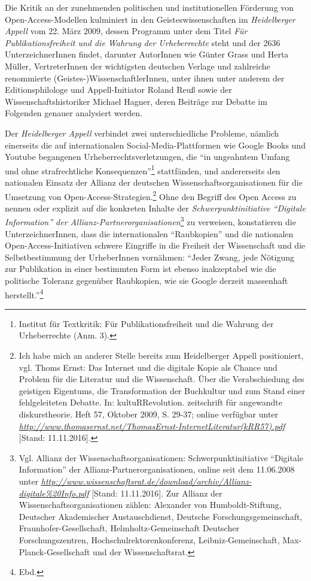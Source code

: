 \documentclass[a4paper,
fontsize=11pt,
oneside,
numbers=noperiodatend,
parskip=half-,
bibliography=totoc,
final
]{scrartcl}
\begin{document}
Die Kritik an der zunehmenden politischen und institutionellen Förderung
von Open-Access-Modellen kulminiert in den Geisteswissenschaften im
\emph{Heidelberger Appell} vom 22. März 2009, dessen Programm unter dem
Titel \emph{Für Publikationsfreiheit und die Wahrung der Urheberrechte}
steht und der 2636 UnterzeichnerInnen findet, darunter AutorInnen wie
Günter Grass und Herta Müller, VertreterInnen der wichtigsten deutschen
Verlage und zahlreiche renommierte (Geistes-)WissenschaftlerInnen, unter
ihnen unter anderem der Editionsphilologe und Appell-Initiator Roland
Reuß sowie der Wissenschaftshistoriker Michael Hagner, deren Beiträge
zur Debatte im Folgenden genauer analysiert werden.

Der \emph{Heidelberger Appell} verbindet zwei unterschiedliche Probleme,
nämlich einerseits die auf internationalen Social-Media-Plattformen wie
Google Books und Youtube begangenen Urheberrechtsverletzungen, die
\enquote{in ungeahntem Umfang und ohne strafrechtliche
Konsequenzen}\footnote{Institut für Textkritik: Für Publikationsfreiheit
  und die Wahrung der Urheberrechte (Anm. 3).} stattfänden, und
andererseits den nationalen Einsatz der Allianz der deutschen
Wissenschaftsorganisationen für die Umsetzung von
Open-Access-Strategien.\footnote{Ich habe mich an anderer Stelle bereits
  zum Heidelberger Appell positioniert, vgl. Thoms Ernst: Das Internet
  und die digitale Kopie als Chance und Problem für die Literatur und
  die Wissenschaft. Über die Verabschiedung des geistigen Eigentums, die
  Transformation der Buchkultur und zum Stand einer fehlgeleiteten
  Debatte. In: kultuRRevolution. zeitschrift für angewandte
  diskurstheorie. Heft 57, Oktober 2009, S. 29-37; online verfügbar
  unter
  \href{http://www.thomasernst.net/ThomasErnst-InternetLiteratur(kRR57).pdf}{\emph{http://www.thomasernst.net/ThomasErnst-InternetLiteratur(kRR57).pdf}}
  {[}Stand: 11.11.2016{]}.} Ohne den Begriff des Open Access zu nennen
oder explizit auf die konkreten Inhalte der \emph{Schwerpunktinitiative
\enquote{Digitale Information} der
Allianz-Partnerorganisationen}\footnote{Vgl. Allianz der
  Wissenschaftsorganisationen: Schwerpunktinitiative \enquote{Digitale
  Information} der Allianz-Partnerorganisationen, online seit dem
  11.06.2008 unter
  \href{http://www.wissenschaftsrat.de/download/archiv/Allianz-digitale\%20Info.pdf}{\emph{http://www.wissenschaftsrat.de/download/archiv/Allianz-digitale\%20Info.pdf}}
  {[}Stand: 11.11.2016{]}. Zur Allianz der Wissenschaftsorganisationen
  zählen: Alexander von Humboldt-Stiftung, Deutscher Akademischer
  Austauschdienst, Deutsche Forschungsgemeinschaft,
  Fraunhofer-Gesellschaft, Helmholtz-Gemeinschaft Deutscher
  Forschungszentren, Hochschulrektorenkonferenz, Leibniz-Gemeinschaft,
  Max-Planck-Gesellschaft und der Wissenschaftsrat.} zu verweisen,
konstatieren die UnterzeichnerInnen, dass die internationalen
\enquote{Raubkopien} und die nationalen Open-Access-Initiativen schwere
Eingriffe in die Freiheit der Wissenschaft und die Selbstbestimmung der
UrheberInnen vornähmen: \enquote{Jeder Zwang, jede Nötigung zur
Publikation in einer bestimmten Form ist ebenso inakzeptabel wie die
politische Toleranz gegenüber Raubkopien, wie sie Google derzeit
massenhaft herstellt.}\footnote{Ebd.}
\end{document}
